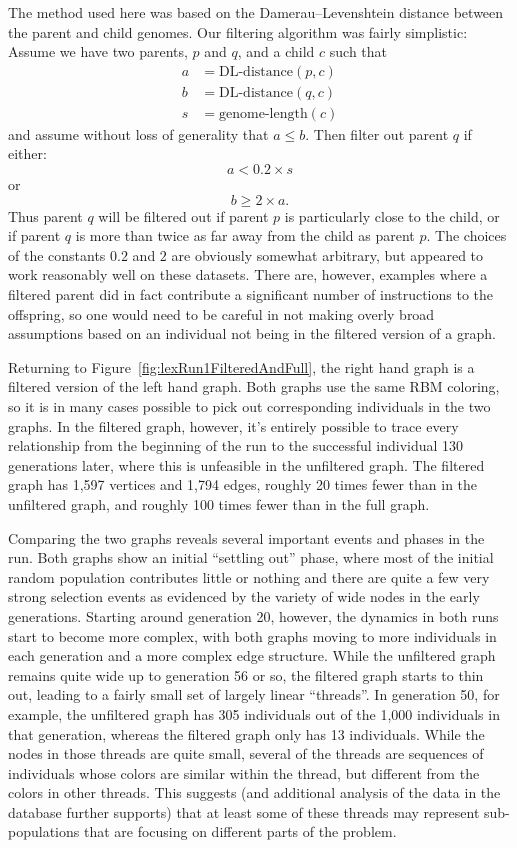 \documentclass{sig-alternate}
\begin{document}
The method used here was based on the Damerau--Levenshtein distance between the
parent and child genomes. Our filtering algorithm was fairly simplistic: Assume we have two parents, $p$ and $q$, and a child $c$ such that
\begin{align*}
	a & = \textrm{DL-distance}(p, c) \\
	b & = \textrm{DL-distance}(q, c) \\
	s & = \textrm{genome-length}(c)
\end{align*}
and assume without loss of generality that $a \leq b$.
Then filter out parent $q$ if either:
\[
	a < 0.2 \times s
\]
or
\[
	b \geq 2 \times a.
\]
Thus parent $q$ will be filtered out if parent $p$ is particularly close to
the child, or if parent $q$ is more than twice as far away from the child as
parent $p$. The choices of the constants $0.2$ and $2$ are obviously somewhat
arbitrary, but appeared to work reasonably well on these datasets. There are,
however, examples where a filtered parent did in fact contribute a significant
number of instructions to the offspring, so one would need to be careful in not
making overly broad assumptions based on an individual not being in the filtered
version of a graph.

Returning to Figure~\ref{fig:lexRun1FilteredAndFull}, the right hand graph is
a filtered version of the left hand graph. Both graphs use the same RBM
coloring, so it is in many cases possible to pick out corresponding individuals
in the two graphs. In the filtered graph, however, it's entirely possible to
trace every relationship from the beginning of the run to the successful
individual 130 generations later, where this is unfeasible in the
unfiltered graph. The filtered graph has 1,597 vertices and 1,794 edges, roughly
20 times fewer than in the unfiltered graph, and roughly 100 times fewer than
in the full graph.

Comparing the two graphs reveals several important events and phases 
in the run. Both graphs show an initial 
``settling out'' phase, where most of the initial random population contributes
little or nothing and there are quite a few very strong selection events as
evidenced by the variety of wide nodes in the early generations. Starting
around generation 20, however, the dynamics in both runs start to become more
complex, with both graphs moving to more individuals in each generation and a
more complex edge structure. While the unfiltered graph remains quite wide up to
generation 56 or so, the filtered graph starts to thin out, leading to a fairly
small set of largely linear ``threads''. In generation 50, for example, the 
unfiltered graph has 305 individuals out of the 1,000 individuals in that 
generation, whereas the filtered graph only has 13 individuals. While the nodes in
those threads are quite small, several of the threads are sequences of individuals
whose colors are similar within the thread, but different from the colors in
other threads. This suggests (and additional analysis of the data in the
database further supports) that at least some of these threads may represent
sub-populations that are focusing on different parts of the problem.
\end{document}
